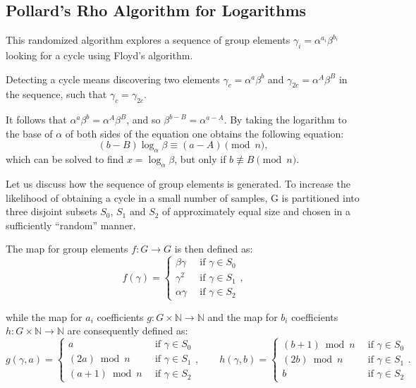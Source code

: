 \documentclass[UTF8]{article}
\begin{document}
\subsection{Pollard's Rho Algorithm for Logarithms}

This randomized algorithm explores a sequence of group elements $\gamma_i = \alpha^{a_i} \beta^{b_i}$ looking for a cycle using Floyd's algorithm.

Detecting a cycle means discovering two elements $\gamma_c = \alpha^{a}\beta^{b}$ and $\gamma_{2c} = \alpha^{A} \beta^{B}$ in the sequence, such that $\gamma_c = \gamma_{2c}$.

It follows that $\alpha^{a} \beta^{b} = \alpha^{A} \beta^{B}$, and so $\beta^{b - B} = \alpha^{a - A}$. By taking the logarithm to the base of $\alpha$ of both sides of the equation one obtains the following equation:
$$(b - B) \log_\alpha{\beta} \equiv (a - A) \pmod{n},$$
which can be solved to find $x=\log_\alpha{\beta}$, but only if $b \not\equiv B \pmod{n}$.

Let us discuss how the sequence of group elements is generated. To increase the likelihood of obtaining a cycle in a small number of samples, G is partitioned into three disjoint subsets $S_0$, $S_1$ and $S_2$ of approximately equal size and chosen in a sufficiently ``random'' manner.

The map for group elements $f: G \rightarrow G$ is then defined as:
$$
f(\gamma) =
\begin{cases}
    \beta \gamma  & \enspace \text{if } \gamma \in S_0 \\
    \gamma^2      & \enspace \text{if } \gamma \in S_1 \\
    \alpha \gamma & \enspace \text{if } \gamma \in S_2
\end{cases},
$$

while the map for $a_i$ coefficients $g: G \times \mathbb{N} \rightarrow \mathbb{N}$ and the map for $b_i$ coefficients $h: G \times \mathbb{N} \rightarrow \mathbb{N}$ are consequently defined as:
$$
g(\gamma, a) =
\begin{cases}
    a                & \enspace \text{if } \gamma \in S_0 \\
    (2a)    \bmod{n} & \enspace \text{if } \gamma \in S_1 \\
    (a + 1) \bmod{n} & \enspace \text{if } \gamma \in S_2
\end{cases},
\qquad
h(\gamma, b) =
\begin{cases}
    (b + 1) \bmod{n} & \enspace \text{if } \gamma \in S_0 \\
    (2b)    \bmod{n} & \enspace \text{if } \gamma \in S_1 \\
    b                & \enspace \text{if } \gamma \in S_2
\end{cases}.
$$
\end{document}
